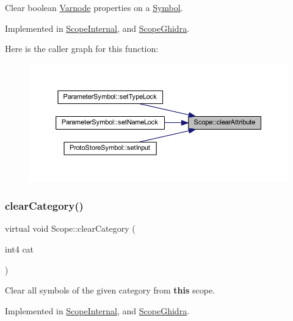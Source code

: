Clear boolean \mbox{\hyperlink{class_varnode}{Varnode}} properties on a \mbox{\hyperlink{class_symbol}{Symbol}}. 



Implemented in \mbox{\hyperlink{class_scope_internal_a8c42cfc4ea5d359bd11d1251ef8d21d7}{Scope\+Internal}}, and \mbox{\hyperlink{class_scope_ghidra_a82f1b5f561b339b03471d39349d108dd}{Scope\+Ghidra}}.

Here is the caller graph for this function\+:
\nopagebreak
\begin{figure}[H]
\begin{center}
\leavevmode
\includegraphics[width=350pt]{class_scope_afb57165fd0d3c182e18ea24e7231975d_icgraph}
\end{center}
\end{figure}
\mbox{\label{class_scope_ab3c8275b6500a9cc620cc31f32ed267e}} 
\subsubsection{\texorpdfstring{clearCategory()}{clearCategory()}}
{\footnotesize\ttfamily virtual void Scope\+::clear\+Category (\begin{DoxyParamCaption}\item[{int4}]{cat }\end{DoxyParamCaption})\hspace{0.3cm}{\ttfamily [pure virtual]}}



Clear all symbols of the given category from {\bfseries{this}} scope. 



Implemented in \mbox{\hyperlink{class_scope_internal_a4139d0dd5d98849bd42291246cdb2f9a}{Scope\+Internal}}, and \mbox{\hyperlink{class_scope_ghidra_a7c52834934353c6d92f5ae459d08e2ad}{Scope\+Ghidra}}.

